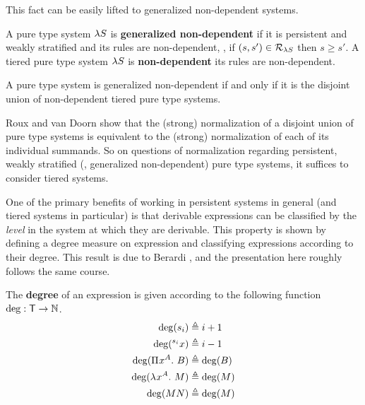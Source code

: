 \documentclass{article}
\begin{document}
This fact can be easily lifted to generalized non-dependent systems.

\begin{definition}
A pure type system $\lambda S$ is \textbf{generalized non-dependent} if it is persistent and weakly stratified and its rules are non-dependent, \ie, if $(s, s') \in \mathcal R_{\lambda S}$ then $s \geq s'$.
A tiered pure type system $\lambda S$ is \textbf{non-dependent} its rules are non-dependent.
\end{definition}

\begin{corollary}
A pure type system is generalized non-dependent if and only if it is the disjoint union of non-dependent tiered pure type systems.
\end{corollary}

Roux and van Doorn \cite{roux-doorn-2014} show that the (strong) normalization of a disjoint union of pure type systems is equivalent to the (strong) normalization of each of its individual summands.
So on questions of normalization regarding persistent, weakly stratified (\eg, generalized non-dependent) pure type systems, it suffices to consider tiered systems.

One of the primary benefits of working in persistent systems in general (and tiered systems in particular) is that derivable expressions can be classified by the \textit{level} in the system at which they are derivable.
This property is shown by defining a degree measure on expression and classifying expressions according to their degree.
This result is due to Berardi \cite{berardi-1990}, and the presentation here roughly follows the same course.

\begin{definition}
The \textbf{degree} of an expression is given according to the following function $\deg : \mathsf{T} \to \mathbb N$.
\begin{align*}
    \deg(s_i) &\triangleq i + 1 \\
    \deg({}^{s_{i}}{x}) &\triangleq i - 1 \\
    \deg({\Pi^{} {x}^{A}. \ {B}}) &\triangleq \deg(B) \\
    \deg(\lambda^{} x^{A}. \ M) &\triangleq \deg(M) \\
    \deg(MN) &\triangleq \deg(M)
\end{align*}
\end{definition}
\end{document}
